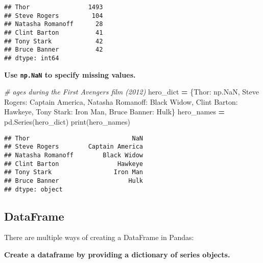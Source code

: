 \documentclass[
]{book}
\newenvironment{Shaded}{\begin{snugshade}}{\end{snugshade}}
\newcommand{\BuiltInTok}[1]{#1}
\newcommand{\CommentTok}[1]{\textcolor[rgb]{0.56,0.35,0.01}{\textit{#1}}}
\newcommand{\NormalTok}[1]{#1}
\newcommand{\OperatorTok}[1]{\textcolor[rgb]{0.81,0.36,0.00}{\textbf{#1}}}
\newcommand{\StringTok}[1]{\textcolor[rgb]{0.31,0.60,0.02}{#1}}
\begin{document}
\begin{verbatim}
## Thor                1493
## Steve Rogers         104
## Natasha Romanoff      28
## Clint Barton          41
## Tony Stark            42
## Bruce Banner          42
## dtype: int64
\end{verbatim}

\textbf{Use \texttt{np.NaN} to specify missing values.}

\begin{Shaded}
\begin{Highlighting}[]
\CommentTok{\# ages during the First Avengers film (2012)}
\NormalTok{hero\_dict }\OperatorTok{=}\NormalTok{ \{}\StringTok{\textquotesingle{}Thor\textquotesingle{}}\NormalTok{: np.NaN,}
             \StringTok{\textquotesingle{}Steve Rogers\textquotesingle{}}\NormalTok{: }\StringTok{\textquotesingle{}Captain America\textquotesingle{}}\NormalTok{,}
             \StringTok{\textquotesingle{}Natasha Romanoff\textquotesingle{}}\NormalTok{: }\StringTok{\textquotesingle{}Black Widow\textquotesingle{}}\NormalTok{,}
             \StringTok{\textquotesingle{}Clint Barton\textquotesingle{}}\NormalTok{: }\StringTok{\textquotesingle{}Hawkeye\textquotesingle{}}\NormalTok{,}
             \StringTok{\textquotesingle{}Tony Stark\textquotesingle{}}\NormalTok{: }\StringTok{\textquotesingle{}Iron Man\textquotesingle{}}\NormalTok{,}
             \StringTok{\textquotesingle{}Bruce Banner\textquotesingle{}}\NormalTok{: }\StringTok{\textquotesingle{}Hulk\textquotesingle{}}\NormalTok{\}}
\NormalTok{hero\_names }\OperatorTok{=}\NormalTok{ pd.Series(hero\_dict)}
\BuiltInTok{print}\NormalTok{(hero\_names)}
\end{Highlighting}
\end{Shaded}

\begin{verbatim}
## Thor                            NaN
## Steve Rogers        Captain America
## Natasha Romanoff        Black Widow
## Clint Barton                Hawkeye
## Tony Stark                 Iron Man
## Bruce Banner                   Hulk
## dtype: object
\end{verbatim}

\hypertarget{dataframe}{%
\subsection{DataFrame}\label{dataframe}}

There are multiple ways of creating a DataFrame in Pandas:

\textbf{Create a dataframe by providing a dictionary of series objects.}
\end{document}
